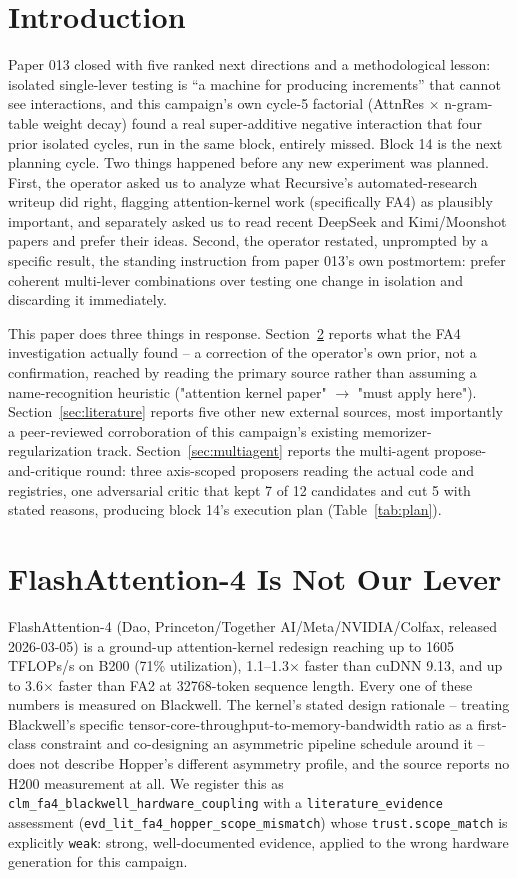 \documentclass{article}
\begin{document}
\section{Introduction}
Paper 013 closed with five ranked next directions and a methodological lesson: isolated single-lever testing is ``a machine for producing increments'' that cannot see interactions, and this campaign's own cycle-5 factorial (AttnRes $\times$ n-gram-table weight decay) found a real super-additive negative interaction that four prior isolated cycles, run in the same block, entirely missed. Block 14 is the next planning cycle. Two things happened before any new experiment was planned. First, the operator asked us to analyze what Recursive's automated-research writeup did right, flagging attention-kernel work (specifically FA4) as plausibly important, and separately asked us to read recent DeepSeek and Kimi/Moonshot papers and prefer their ideas. Second, the operator restated, unprompted by a specific result, the standing instruction from paper 013's own postmortem: prefer coherent multi-lever combinations over testing one change in isolation and discarding it immediately.

This paper does three things in response. Section~\ref{sec:fa4} reports what the FA4 investigation actually found -- a correction of the operator's own prior, not a confirmation, reached by reading the primary source rather than assuming a name-recognition heuristic ("attention kernel paper" $\to$ "must apply here"). Section~\ref{sec:literature} reports five other new external sources, most importantly a peer-reviewed corroboration of this campaign's existing memorizer-regularization track. Section~\ref{sec:multiagent} reports the multi-agent propose-and-critique round: three axis-scoped proposers reading the actual code and registries, one adversarial critic that kept 7 of 12 candidates and cut 5 with stated reasons, producing block 14's execution plan (Table~\ref{tab:plan}).

\section{FlashAttention-4 Is Not Our Lever}
\label{sec:fa4}
FlashAttention-4 (Dao, Princeton/Together AI/Meta/NVIDIA/Colfax, released 2026-03-05) is a ground-up attention-kernel redesign reaching up to 1605 TFLOPs/s on B200 (71\% utilization), 1.1--1.3$\times$ faster than cuDNN 9.13, and up to 3.6$\times$ faster than FA2 at 32768-token sequence length. Every one of these numbers is measured on Blackwell. The kernel's stated design rationale -- treating Blackwell's specific tensor-core-throughput-to-memory-bandwidth ratio as a first-class constraint and co-designing an asymmetric pipeline schedule around it -- does not describe Hopper's different asymmetry profile, and the source reports no H200 measurement at all. We register this as \texttt{clm\_fa4\_blackwell\_hardware\_coupling} with a \texttt{literature\_evidence} assessment (\texttt{evd\_lit\_fa4\_hopper\_scope\_mismatch}) whose \texttt{trust.scope\_match} is explicitly \texttt{weak}: strong, well-documented evidence, applied to the wrong hardware generation for this campaign.
\end{document}
